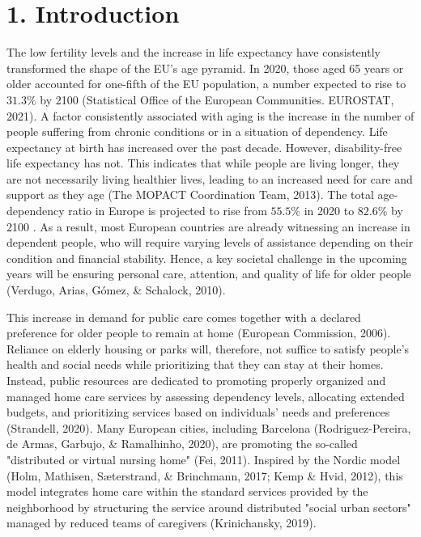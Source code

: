 \documentclass[10pt]{article}
\begin{document}
\section*{1. Introduction}
The low fertility levels and the increase in life expectancy have consistently transformed the shape of the EU's age pyramid. In 2020, those aged 65 years or older accounted for one-fifth of the EU population, a number expected to rise to $31.3 \%$ by 2100 (Statistical Office of the European Communities. EUROSTAT, 2021). A factor consistently associated with aging is the increase in the number of people suffering from chronic conditions or in a situation of dependency. Life expectancy at birth has increased over the past decade. However, disability-free life expectancy has not. This indicates that while people are living longer, they are not necessarily living healthier lives, leading to an increased need for care and support as they age (The MOPACT Coordination Team, 2013). The total age-dependency ratio in Europe is projected to rise from $55.5 \%$ in 2020 to $82.6 \%$ by 2100 . As a result, most European countries are already witnessing an increase in dependent people, who will require varying levels of assistance depending on their condition and financial stability. Hence, a key societal challenge in the upcoming years will be ensuring personal care, attention, and quality of life for older people (Verdugo, Arias, Gómez, \& Schalock, 2010).

This increase in demand for public care comes together with a declared preference for older people to remain at home (European Commission, 2006). Reliance on elderly housing or parks will, therefore, not suffice to satisfy people's health and social needs while prioritizing that they can stay at their homes. Instead, public resources are dedicated to promoting properly organized and managed home care services by assessing dependency levels, allocating extended budgets, and prioritizing services based on individuals' needs and preferences (Strandell, 2020). Many European cities, including Barcelona (Rodriguez-Pereira, de Armas, Garbujo, \& Ramalhinho, 2020), are promoting the so-called "distributed or virtual nursing home" (Fei, 2011). Inspired by the Nordic model (Holm, Mathisen, Sæterstrand, \& Brinchmann, 2017; Kemp \& Hvid, 2012), this model integrates home care within the standard services provided by the neighborhood by structuring the service around distributed "social urban sectors" managed by reduced teams of caregivers (Krinichansky, 2019).
\end{document}
